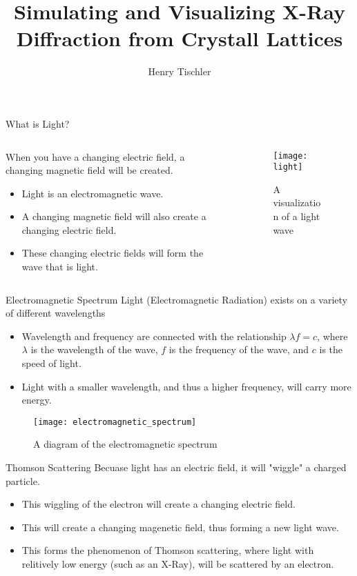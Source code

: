 \documentclass[aspectratio=169]{beamer}
\title {Simulating and Visualizing X-Ray Diffraction from Crystall Lattices}
\author{Henry Tischler}
\institute[Institute of Computing in Research]
\begin{document}
\titlepage


\begin {frame}{What is Light?}
\begin{columns}
				
	\begin{column}[b]{.5\textwidth}
		When you have a changing electric field, a changing magnetic field will be created.
		\begin{itemize}
			\item Light is an electromagnetic wave.
			\item A changing magnetic field will also create a changing electric field.
			\item These changing electric fields will form the wave that is light.
		\end{itemize}		
	\end{column}\
				
	\begin{column}{.5\textwidth}
		\begin{figure}
			\texttt{[image: light]}
			\caption{A visualization of a light wave}
		\end{figure}
	\end{column}
				
\end{columns}
\end{frame}

\begin{frame}[t]{Electromagnetic Spectrum}
	Light (Electromagnetic Radiation) exists on a variety of different wavelengths
	\begin{itemize}
		\item Wavelength and frequency are connected with the relationship $\lambda f = c$, where $\lambda$ is the wavelength of the wave, $f$ is the frequency of the wave, and $c$ is the speed of light.
		\item Light with a smaller wavelength, and thus a higher frequency, will carry more energy.
	\end{itemize}
	\begin{figure}
		\texttt{[image: electromagnetic\_spectrum]}
		\caption {A diagram of the electromagnetic spectrum}
	\end{figure}
\end{frame}

\begin{frame}[t]{Thomson Scattering}
  Becuase light has an electric field, it will "wiggle" a charged particle.
	\begin{itemize}
		\item This wiggling of the electron will create a changing electric field.
		\item This will create a changing magenetic field, thus forming a new light wave. 
		\item This forms the phenomenon of Thomson scattering, where light with relitively low energy (such as an X-Ray), will be scattered by an electron.
	\end{itemize}
				
\end{frame}
\end{document}
